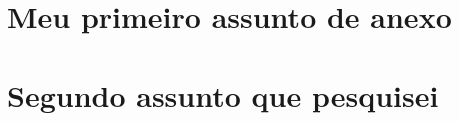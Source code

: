 \documentclass[
	12pt,				%
	oneside,			%
	a4paper,			%
	chapter=TITLE,		%
	english,			%
	brazil				%
	]{abntex2}
\begin{document}
\begin{anexosenv}

\chapter{Meu primeiro assunto de anexo}
\lipsum[30]


\chapter{Segundo assunto que pesquisei}
\lipsum[31]

\end{anexosenv}

\printindex
\end{document}
